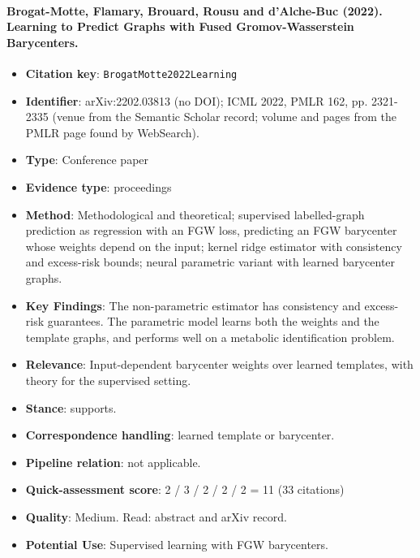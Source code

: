 \documentclass[journal,onecolumn]{IEEEtran}
\begin{document}
\paragraph{Brogat-Motte, Flamary, Brouard, Rousu and d'Alche-Buc (2022). Learning to Predict Graphs with Fused Gromov-Wasserstein Barycenters.~\cite{BrogatMotte2022Learning}}\mbox{}

\begin{itemize}

\item{} \textbf{Citation key}: \texttt{BrogatMotte2022Learning}

\item{} \textbf{Identifier}: arXiv:2202.03813 (no DOI); ICML 2022, PMLR 162, pp. 2321-2335 (venue from the Semantic Scholar record; volume and pages from the PMLR page found by WebSearch).

\item{} \textbf{Type}: Conference paper

\item{} \textbf{Evidence type}: proceedings

\item{} \textbf{Method}: Methodological and theoretical; supervised labelled-graph prediction as regression with an FGW loss, predicting an FGW barycenter whose weights depend on the input; kernel ridge estimator with consistency and excess-risk bounds; neural parametric variant with learned barycenter graphs.

\item{} \textbf{Key Findings}: The non-parametric estimator has consistency and excess-risk guarantees. The parametric model learns both the weights and the template graphs, and performs well on a metabolic identification problem.

\item{} \textbf{Relevance}: Input-dependent barycenter weights over learned templates, with theory for the supervised setting.

\item{} \textbf{Stance}: supports.

\item{} \textbf{Correspondence handling}: learned template or barycenter.

\item{} \textbf{Pipeline relation}: not applicable.

\item{} \textbf{Quick-assessment score}: 2 / 3 / 2 / 2 / 2 = 11 (33 citations)

\item{} \textbf{Quality}: Medium. Read: abstract and arXiv record.

\item{} \textbf{Potential Use}: Supervised learning with FGW barycenters.

\end{itemize}
\end{document}
